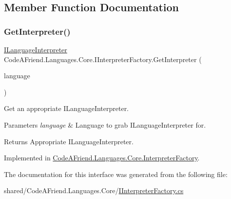 \subsection{Member Function Documentation}
\mbox{\label{interface_code_a_friend_1_1_languages_1_1_core_1_1_i_interpreter_factory_a4d2f3ae695515fc3c28f352a20bfd601}} 
\subsubsection{\texorpdfstring{Get\+Interpreter()}{GetInterpreter()}}
{\footnotesize\ttfamily \mbox{\hyperlink{interface_code_a_friend_1_1_data_model_1_1_i_language_interpreter}{I\+Language\+Interpreter}} Code\+A\+Friend.\+Languages.\+Core.\+I\+Interpreter\+Factory.\+Get\+Interpreter (\begin{DoxyParamCaption}\item[{\mbox{\hyperlink{namespace_code_a_friend_1_1_data_model_a13e088c525db1b03a4de75420ced79b2}{Supported\+Language}}}]{language }\end{DoxyParamCaption})}



Get an appropriate I\+Language\+Interpreter. 


\begin{DoxyParams}{Parameters}
{\em language} & Language to grab I\+Language\+Interpreter for.\\
\hline
\end{DoxyParams}
\begin{DoxyReturn}{Returns}
Appropriate I\+Language\+Interpreter.
\end{DoxyReturn}


Implemented in \mbox{\hyperlink{class_code_a_friend_1_1_languages_1_1_core_1_1_interpreter_factory_ac39dea6ec4f5612ecf3ab49a920fc543}{Code\+A\+Friend.\+Languages.\+Core.\+Interpreter\+Factory}}.



The documentation for this interface was generated from the following file\+:\begin{DoxyCompactItemize}
\item 
shared/\+Code\+A\+Friend.\+Languages.\+Core/\mbox{\hyperlink{_i_interpreter_factory_8cs}{I\+Interpreter\+Factory.\+cs}}\end{DoxyCompactItemize}
